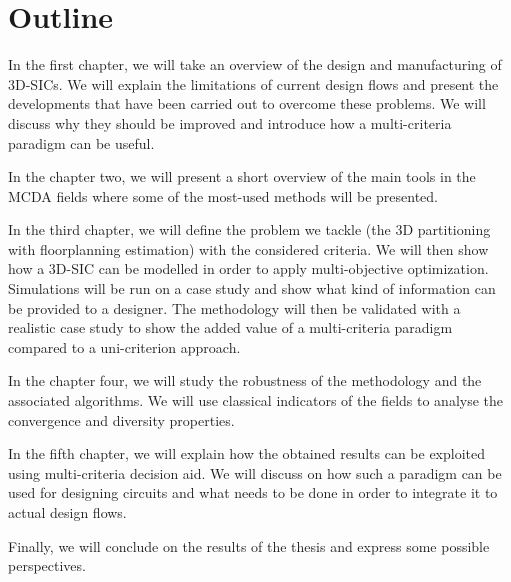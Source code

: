 \section*{Outline}
In the first chapter, we will take an overview of the design and manufacturing of 3D-SICs. We will explain the limitations of current design flows and present the developments that have been carried out to overcome these problems. We will discuss why they should be improved and introduce how a multi-criteria paradigm can be useful.

In the chapter two, we will present a short overview of the main tools in the MCDA fields where some of the most-used methods will be presented.

In the third chapter, we will define the problem we tackle (the 3D partitioning with floorplanning estimation) with the considered criteria. We will then show how a 3D-SIC can be modelled in order to apply multi-objective optimization. Simulations will be run on a case study and show what kind of information can be provided to a designer. The methodology will then be validated with a realistic case study to show the added value of a multi-criteria paradigm compared to a uni-criterion approach.

In the chapter four, we will study the robustness of the methodology and the associated algorithms. We will use classical indicators of the fields to analyse the convergence and diversity properties.

In the fifth chapter, we will explain how the obtained results can be exploited using multi-criteria decision aid. We will discuss on how such a paradigm can be used for designing circuits and what needs to be done in order to integrate it to actual design flows.

Finally, we will conclude on the results of the thesis and express some possible perspectives.

